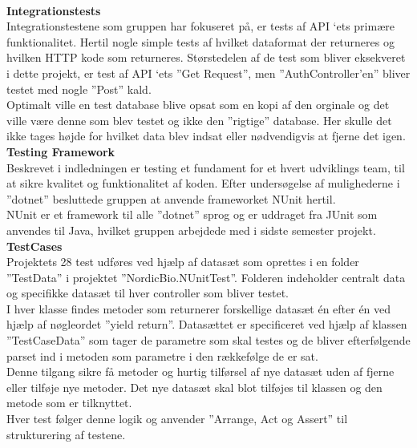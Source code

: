\\
\textbf{Integrationstests}\\
Integrationstestene som gruppen har fokuseret på, er tests af API ‘ets primære funktionalitet. 
Hertil nogle simple tests af hvilket dataformat der returneres og hvilken HTTP kode som returneres. 
Størstedelen af de test som bliver eksekveret i dette projekt, er test af API ‘ets ”Get Request”, men 
”AuthController’en” bliver testet med nogle ”Post” kald. \\

Optimalt ville en test database blive opsat som en kopi af den orginale og det ville være denne som 
blev testet og ikke den ”rigtige” database. Her skulle det ikke tages højde for hvilket data blev indsat 
eller nødvendigvis at fjerne det igen.\\ 

\textbf{Testing Framework}\\
Beskrevet i indledningen er testing et fundament for et hvert udviklings team, til at sikre 
kvalitet og funktionalitet af koden. Efter undersøgelse af mulighederne i ”dotnet” besluttede 
gruppen at anvende frameworket NUnit hertil. \\

NUnit er et framework til alle ”dotnet” sprog og er uddraget fra JUnit som anvendes til Java, 
hvilket gruppen arbejdede med i sidste semester projekt.\\

\textbf{TestCases}\\
Projektets 28 test udføres ved hjælp af datasæt som oprettes i en folder ”TestData” i projektet 
”NordicBio.NUnitTest”. Folderen indeholder centralt data og specifikke datasæt til hver controller 
som bliver testet. \\

I hver klasse findes metoder som returnerer forskellige datasæt én efter én ved hjælp af nøgleordet 
”yield return”. Datasættet er specificeret ved hjælp af klassen ”TestCaseData” som tager de parametre 
som skal testes og de bliver efterfølgende parset ind i metoden som parametre i den rækkefølge de er sat.\\

Denne tilgang sikre få metoder og hurtig tilførsel af nye datasæt uden af fjerne eller tilføje nye metoder. 
Det nye datasæt skal blot tilføjes til klassen og den metode som er tilknyttet.\\

Hver test følger denne logik og anvender ”Arrange, Act og Assert” til strukturering af testene. 




